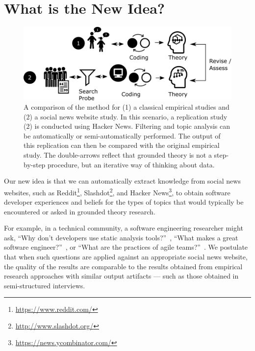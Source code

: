 \documentclass{sig-alternate}
\begin{document}
\section{What is the New Idea?}

\begin{figure}
\centering
\includegraphics[width=\linewidth]{concept}
\caption{A comparison of the method for (1) a classical empirical studies and (2) a social news website study. In this scenario, a replication study (2) is conducted using Hacker News. Filtering and topic analysis can be automatically or semi-automatically performed. The output of this replication can then be compared with the original empirical study. The double-arrows reflect that grounded theory is not a step-by-step procedure, but an iterative way of thinking about data.\label{fig:concept}}
\end{figure}

Our new idea is that we can automatically extract knowledge from social news websites, such as Reddit\footnote{\url{https://www.reddit.com/}}, Slashdot\footnote{\url{http://www.slashdot.org/}}, and Hacker News\footnote{\url{https://news.ycombinator.com/}}, to obtain software developer experiences and beliefs for the types of topics that would typically be encountered or asked in grounded theory research.

For example, in a technical community, a software engineering researcher might ask, ``Why don't developers use static analysis tools?''~\cite{Johnson2013a}, ``What makes a great software engineer?''~\cite{Li2015}, or ``What are the practices of agile teams?''~\cite{Hoda2011}. We postulate that when such questions are applied against an appropriate social news website, the quality of the results are comparable to the results obtained from empirical research approaches with similar output artifacts --- such as those obtained in semi-structured interviews.
\end{document}
